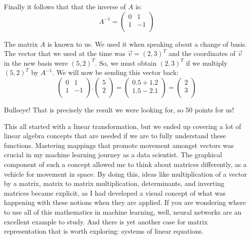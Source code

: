 \documentclass[a4,12pt,twosided,openany]{memoir}
\begin{document}
\par 
\indent
Finally it follows that that the inverse of $A$ is:
\[A^{-1} = \begin{pmatrix}
0 & 1 \\
1 & -1 \\
\end{pmatrix}\]
\par 
\indent
The matrix $A$ is known to us. We used it when speaking about a change of basis. The vector that we used at the time was  $\overrightarrow{v} = (2,3)^T$ and the coordinates of $\overrightarrow{v}$ in the new basis were  $(5,2)^T$. So, we must obtain $(2,3)^T$ if we multiply $(5,2)^T$ by $A^{-1}$. We will now be sending this vector back:
\[
 \begin{pmatrix}
0 & 1 \\
1 & -1 \\
\end{pmatrix}.\begin{pmatrix}
5\\
2\\
\end{pmatrix} = \begin{pmatrix}
0.5 + 1.2 \\
1.5 - 2.1 \\
\end{pmatrix} = \begin{pmatrix}
2\\
3\\
\end{pmatrix}
\]
\par 
\indent
Bullseye! That is precisely the result we were looking for, so 50 points for us!
\par 
\indent
This all started with a linear transformation, but we ended up covering a lot of linear algebra concepts that are needed if we are to fully understand these functions. Mastering mappings that promote movement amongst vectors was crucial in my machine learning journey as a data scientist. The graphical component of such a concept allowed me to think about matrices differently, as a vehicle for movement in space. By doing this, ideas like multiplication of a vector by a matrix, matrix to matrix multiplication, determinants, and inverting matrices became explicit, as I had developed a visual concept of what was happening with these notions when they are applied. If you are wondering where to use all of this mathematics in machine learning, well, neural networks are an excellent example to study. And there is yet another case for matrix representation that is worth exploring: systems of linear equations.
\end{document}
